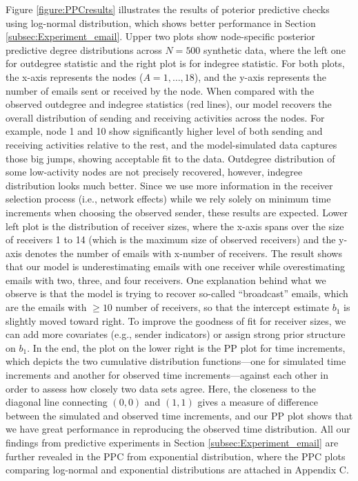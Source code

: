 \documentclass[ba]{imsart}
\numberwithin{equation}{section}
\theoremstyle{plain}
\begin{document}
	Figure \ref{figure:PPCresults} illustrates the results of poterior predictive checks using log-normal distribution, which shows better performance in Section \ref{subsec:Experiment_email}. Upper two plots show node-specific posterior predictive degree distributions across $N=500$ synthetic data, where the left one for outdegree statistic and the right plot is for indegree statistic. For both plots, the x-axis represents the nodes ($A=1,\ldots,18$), and the y-axis represents the number of emails sent or received by the node. When compared with the observed outdegree and indegree statistics (red lines), our model recovers the overall distribution of sending and receiving activities across the nodes. For example, node 1 and 10 show significantly higher level of both sending and receiving activities relative to the rest, and the model-simulated data captures those big jumps, showing acceptable fit to the data. Outdegree distribution of some low-activity nodes are not precisely recovered, however, indegree distribution looks much better. Since we use more information in the receiver selection process (i.e., network effects) while we rely solely on minimum time increments when choosing the observed sender, these results are expected. Lower left plot is the distribution of receiver sizes, where the x-axis spans over the size of receivers 1 to 14 (which is the maximum size of observed receivers) and the y-axis denotes the number of emails with x-number of receivers. The result shows that our model is underestimating emails with one receiver while overestimating emails with two, three, and four receivers. One explanation behind what we observe is that the model is trying to recover so-called ``broadcast'' emails, which are the emails with $\geq 10$ number of receivers, so that the intercept estimate $b_1$ is slightly moved toward right. To improve the goodness of fit for receiver sizes, we can add more covariates (e.g., sender indicators) or assign strong prior structure on $b_1$. In the end, the plot on the lower right is the PP plot for time increments, which depicts the two cumulative distribution functions---one for simulated time increments and another for observed time increments---against each other in order to assess how closely two data sets agree. Here, the closeness to the diagonal line connecting $(0, 0)$ and $(1, 1)$ gives a measure of difference between the simulated and observed time increments, and our PP plot shows that we have great performance in reproducing the observed time distribution. All our findings from predictive experiments in Section \ref{subsec:Experiment_email} are further revealed in the PPC from exponential distribution, where the PPC plots comparing log-normal and exponential distributions are attached in Appendix C.
\end{document}
